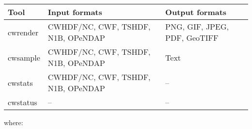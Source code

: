 \begin{tabular}{|l|p{5cm}|p{5cm}|}
  \hline

  Tool & Input formats & Output formats \\ \hline 

  cwrender & CWHDF/NC, CWF, TSHDF, N1B, OPeNDAP & PNG, GIF, JPEG, PDF,
  GeoTIFF \\ \hline

  cwsample & CWHDF/NC, CWF, TSHDF, N1B, OPeNDAP & Text \\ \hline

  cwstats & CWHDF/NC, CWF, TSHDF, N1B, OPeNDAP & -- \\ \hline

  cwstatus & -- & -- \\ \hline

\end{tabular}

where:

